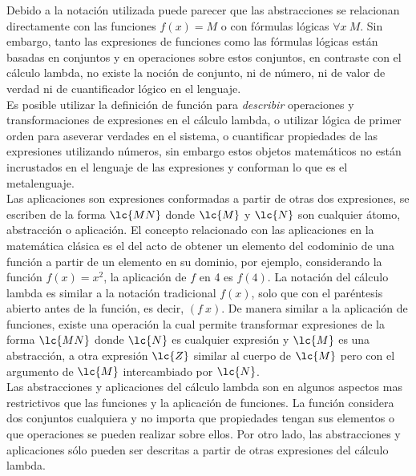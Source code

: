 Debido a la notación utilizada puede parecer que las abstracciones se relacionan
directamente con las funciones \(f(x)=M\) o con fórmulas lógicas \(\forall x\
M\). Sin embargo, tanto las expresiones de funciones como las fórmulas lógicas
están basadas en conjuntos y en operaciones sobre estos conjuntos, en contraste
con el cálculo lambda, no existe la noción de conjunto, ni de número, ni de
valor de verdad ni de cuantificador lógico en el lenguaje. \\

Es posible utilizar la definición de función para \emph{describir} operaciones y
transformaciones de expresiones en el cálculo lambda, o utilizar lógica de
primer orden para aseverar verdades en el sistema, o cuantificar propiedades de
las expresiones utilizando números, sin embargo estos objetos matemáticos  no
están incrustados en el lenguaje de las expresiones y conforman lo que es el
metalenguaje. \\

Las aplicaciones son expresiones conformadas a partir de otras dos expresiones,
se escriben de la forma \(\lc{M N}\) donde \(\lc{M}\) y \(\lc{N}\) son cualquier
átomo, abstracción o aplicación. El concepto relacionado con las aplicaciones en
la matemática clásica es el del acto de obtener un elemento del codominio de una
función a partir de un elemento en su dominio, por ejemplo, considerando la
función \(f(x)=x^{2}\), la aplicación de \(f\) en 4 es \(f(4)\). La notación del
cálculo lambda es similar a la notación tradicional \(f(x)\), solo que con el
paréntesis abierto antes de la función, es decir, \((f\ x)\). De manera similar
a la aplicación de funciones, existe una operación la cual permite transformar
expresiones de la forma \(\lc{M N}\) donde \(\lc{N}\) es cualquier expresión y
\(\lc{M}\) es una abstracción, a otra expresión \(\lc{Z}\) similar al cuerpo de
\(\lc{M}\) pero con el argumento de \(\lc{M}\) intercambiado por \(\lc{N}\). \\

Las abstracciones y aplicaciones del cálculo lambda son en algunos aspectos mas
restrictivos que las funciones y la aplicación de funciones. La función
considera dos conjuntos cualquiera y no importa que propiedades tengan sus
elementos o que operaciones se pueden realizar sobre ellos. Por otro lado, las
abstracciones y aplicaciones sólo pueden ser descritas a partir de otras
expresiones del cálculo lambda. \\

